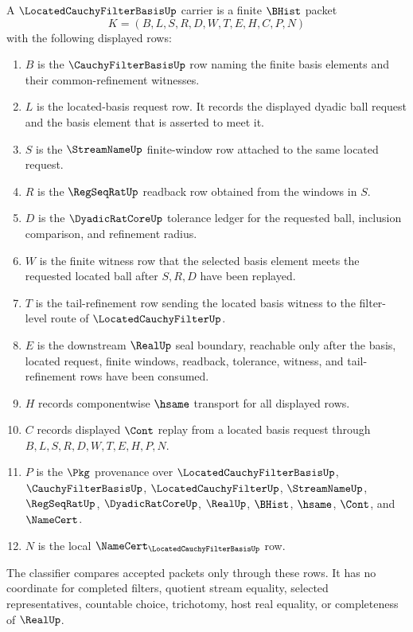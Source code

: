 \begin{definition}
\label{def:cauchy-filter-basis-real-carrier}
A $\LocatedCauchyFilterBasisUp$ carrier is a finite $\BHist$ packet
$$
K=(B,L,S,R,D,W,T,E,H,C,P,N)
$$
with the following displayed rows:
\begin{enumerate}
\item $B$ is the $\CauchyFilterBasisUp$ row naming the finite basis elements and their common-refinement witnesses.
\item $L$ is the located-basis request row. It records the displayed dyadic ball request and the basis element that is asserted to meet it.
\item $S$ is the $\StreamNameUp$ finite-window row attached to the same located request.
\item $R$ is the $\RegSeqRatUp$ readback row obtained from the windows in $S$.
\item $D$ is the $\DyadicRatCoreUp$ tolerance ledger for the requested ball, inclusion comparison, and refinement radius.
\item $W$ is the finite witness row that the selected basis element meets the requested located ball after $S,R,D$ have been replayed.
\item $T$ is the tail-refinement row sending the located basis witness to the filter-level route of $\LocatedCauchyFilterUp$.
\item $E$ is the downstream $\RealUp$ seal boundary, reachable only after the basis, located request, finite windows, readback, tolerance, witness, and tail-refinement rows have been consumed.
\item $H$ records componentwise $\hsame$ transport for all displayed rows.
\item $C$ records displayed $\Cont$ replay from a located basis request through $B,L,S,R,D,W,T,E,H,P,N$.
\item $P$ is the $\Pkg$ provenance over $\LocatedCauchyFilterBasisUp$, $\CauchyFilterBasisUp$, $\LocatedCauchyFilterUp$, $\StreamNameUp$, $\RegSeqRatUp$, $\DyadicRatCoreUp$, $\RealUp$, $\BHist$, $\hsame$, $\Cont$, and $\NameCert$.
\item $N$ is the local $\NameCert_{\LocatedCauchyFilterBasisUp}$ row.
\end{enumerate}
The classifier compares accepted packets only through these rows. It has no coordinate for completed filters, quotient stream equality, selected representatives, countable choice, trichotomy, host real equality, or completeness of $\RealUp$.
\end{definition}

